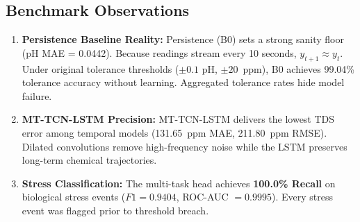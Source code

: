 \documentclass[conference]{IEEEtran}
\begin{document}
\begin{table}[htbp]
\caption{Benchmark Comparison Under Chronological Evaluation}
\label{tab:benchmarks}
\centering
\footnotesize
\setlength{\tabcolsep}{2.5pt}
\end{table}

\subsection{Benchmark Observations}
\begin{enumerate}
    \item \textbf{Persistence Baseline Reality:} Persistence (B0) sets a strong sanity floor (pH MAE = 0.0442). Because readings stream every 10 seconds, $y_{t+1} \approx y_t$. Under original tolerance thresholds ($\pm 0.1$ pH, $\pm 20$~ppm), B0 achieves 99.04\% tolerance accuracy without learning. Aggregated tolerance rates hide model failure.
    \item \textbf{MT-TCN-LSTM Precision:} MT-TCN-LSTM delivers the lowest TDS error among temporal models (131.65~ppm MAE, 211.80~ppm RMSE). Dilated convolutions remove high-frequency noise while the LSTM preserves long-term chemical trajectories.
    \item \textbf{Stress Classification:} The multi-task head achieves \textbf{100.0\% Recall} on biological stress events ($F1 = 0.9404$, ROC-AUC $= 0.9995$). Every stress event was flagged prior to threshold breach.
\end{enumerate}
\end{document}
